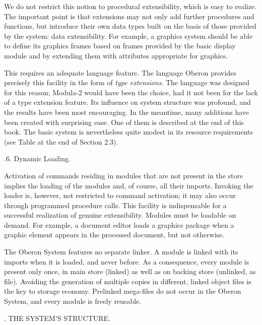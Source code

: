 We do not restrict this notion to procedural extensibility, which is
easy to realize. The important point is that extensions may not only
add further procedures and functions, but introduce their own data
types built on the basis of those provided by the system: data
extensibility. For example, a graphics system should be able to define
its graphics frames based on frames provided by the basic display
module and by extending them with attributes appropriate for graphics.


This requires an adequate language feature. The language Oberon
provides precisely this facility in the form of \emph{type extensions}. The
language was designed for this reason; Modula-2 would have been the
choice, had it not been for the lack of a type extension feature. Its
influence on system structure was profound, and the results have been
most encouraging. In the meantime, many additions have been created
with surprising ease. One of them is described at the end of this
book. The basic system is nevertheless quite modest in its resource
requirements (see Table at the end of Section 2.3).

.6. Dynamic Loading.

Activation of commands residing in modules that are not present in the
store implies the loading of the modules and, of course, all their
imports. Invoking the loader is, however, not restricted to command
activation; it may also occur through programmed procedure calls. This
facility is indispensable for a successful realization of genuine
extensibility. Modules must be loadable on demand. For example, a
document editor loads a graphics package when a graphic element
appears in the processed document, but not otherwise.

The Oberon System features no separate linker. A module is linked with
its imports when it is loaded, and never before. As a consequence,
every module is present only once, in main store (linked) as well as
on backing store (unlinked, as file). Avoiding the generation of
multiple copies in different, linked object files is the key to
storage economy. Prelinked mega-files do not occur in the Oberon
System, and every module is freely reusable.


. THE SYSTEM'S STRUCTURE.


